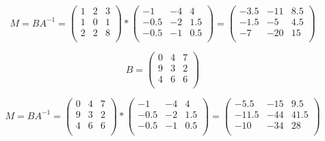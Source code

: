 \documentclass{article}
\begin{document}
\[
M = BA^{-1} =
\begin{pmatrix}
  1 & 2 & 3 \\
  1 & 0 & 1 \\
  2 & 2 & 8 \\
\end{pmatrix}
*
\begin{pmatrix}
  -1 & -4 & 4 \\
  -0.5 & -2 & 1.5 \\
  -0.5 & -1 & 0.5 \\
\end{pmatrix}
=
\begin{pmatrix}
  -3.5 & -11 & 8.5 \\
  -1.5 & -5 & 4.5 \\
  -7 & -20 & 15 \\
\end{pmatrix}
\]

\[
B =
\begin{pmatrix}
  0 & 4 & 7 \\
  9 & 3 & 2 \\
  4 & 6 & 6 \\
\end{pmatrix}
\]

\[
M = BA^{-1} =
\begin{pmatrix}
  0 & 4 & 7 \\
  9 & 3 & 2 \\
  4 & 6 & 6 \\
\end{pmatrix}
*
\begin{pmatrix}
  -1 & -4 & 4 \\
  -0.5 & -2 & 1.5 \\
  -0.5 & -1 & 0.5 \\
\end{pmatrix}
=
\begin{pmatrix}
  -5.5 & -15 & 9.5 \\
  -11.5 & -44 & 41.5 \\
  -10 & -34 & 28 \\
\end{pmatrix}
\]
\end{document}

